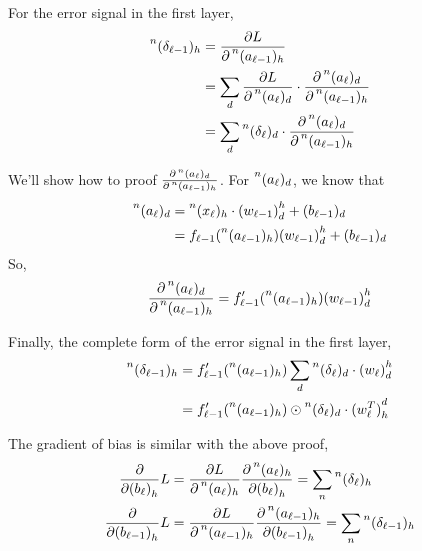 \documentclass[12pt,a4paper]{article}%
\theoremstyle{definition}
\theoremstyle{plain}
\numberwithin{equation}{section}
\begin{document}
For the error signal in the first layer,
\begin{align*}
\begin{split}
\prescript{n}{}{(\delta_{\ell-1})}_{h} &= \frac{\partial L}{\partial \prescript{n}{}{(a_{\ell-1})}_{h}} \\
																  &= \sum\limits_{d} \frac{\partial L}{\partial \prescript{n}{}{(a_{\ell})}_{d}} \cdot \frac{\partial \prescript{n}{}{(a_{\ell})}_{d}}{\partial \prescript{n}{}{(a_{\ell-1})}_{h}} \\
														          &= \sum\limits_{d} 	\prescript{n}{}{(\delta_{\ell})}_{d} \cdot \frac{\partial \prescript{n}{}{(a_{\ell})}_{d}}{\partial \prescript{n}{}{(a_{\ell-1})}_{h}}			  
\end{split}
\label{delta1}
\end{align*}

We'll show how to proof $\frac{\partial \prescript{n}{}{(a_{\ell})}_{d}}{\partial \prescript{n}{}{(a_{\ell-1})}_{h}}$. For $ \prescript{n}{}{(a_{\ell})}_{d}   $, we know that 
\begin{align*}
\prescript{n}{}{(a_{\ell})}_{d} &= \prescript{n}{}{(x_{\ell})}_{h} \cdot {(w_{\ell-1})}^{h}_{d}  + (b_{\ell-1})_{d} \\
													  &= f_{\ell-1}(\prescript{n}{}{(a_{\ell-1})}_{h}) {(w_{\ell-1})}^{h}_{d} + (b_{\ell-1})_{d}
\end{align*}
So,
\begin{equation}
\frac{\partial \prescript{n}{}{(a_{\ell})}_{d}}{\partial \prescript{n}{}{(a_{\ell-1})}_{h}} = f'_{\ell-1}(\prescript{n}{}{(a_{\ell-1})}_{h}) {(w_{\ell-1})}^{h}_{d} 
\end{equation}

Finally, the complete form of the error signal in the first layer,
\begin{align*}
\prescript{n}{}{(\delta_{\ell-1})}_{h} &= f'_{\ell-1}(\prescript{n}{}{(a_{\ell-1})}_{h}) \sum\limits_{d} 	\prescript{n}{}{(\delta_{\ell})}_{d} \cdot  {(w_{\ell})}^{h}_{d} \\
																  &= f'_{\ell-1}(\prescript{n}{}{(a_{\ell-1})}_{h}) \odot \prescript{n}{}{(\delta_{\ell})}_{d} \cdot {(w_{\ell}^{T})}^{d}_{h}
\end{align*}

The gradient of bias is similar with the above proof,
\begin{align*}
\frac{\partial}{\partial {(b_{\ell})}_{h}} L  &= \frac{\partial L}{\partial \prescript{n}{}{(a_{\ell})}_{h}} \frac{\partial \prescript{n}{}{(a_{\ell})}_{h}}{\partial {(b_{\ell})}_{h}} = \sum\limits_{n} \prescript{n}{}{(\delta_{\ell})}_{h} \\
\frac{\partial}{\partial {(b_{\ell-1})}_{h}} L  &= \frac{\partial L}{\partial \prescript{n}{}{(a_{\ell-1})}_{h}} \frac{\partial \prescript{n}{}{(a_{\ell-1})}_{h}}{\partial {(b_{\ell-1})}_{h}} = \sum\limits_{n} \prescript{n}{}{(\delta_{\ell-1})}_{h}
\end{align*}
\end{document}
